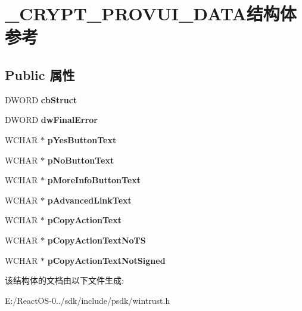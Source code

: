 \hypertarget{struct___c_r_y_p_t___p_r_o_v_u_i___d_a_t_a}{}\section{\+\_\+\+C\+R\+Y\+P\+T\+\_\+\+P\+R\+O\+V\+U\+I\+\_\+\+D\+A\+T\+A结构体 参考}
\label{struct___c_r_y_p_t___p_r_o_v_u_i___d_a_t_a}
\subsection*{Public 属性}
\begin{DoxyCompactItemize}
\item 
\mbox{\label{struct___c_r_y_p_t___p_r_o_v_u_i___d_a_t_a_a03b1e843fa9896f0546f51f0ba84831b}} 
D\+W\+O\+RD {\bfseries cb\+Struct}
\item 
\mbox{\label{struct___c_r_y_p_t___p_r_o_v_u_i___d_a_t_a_a644fe3b35c2614422038c10a9bec33a8}} 
D\+W\+O\+RD {\bfseries dw\+Final\+Error}
\item 
\mbox{\label{struct___c_r_y_p_t___p_r_o_v_u_i___d_a_t_a_a70a18e3d48f4a634eff4d34fe0e9eb4b}} 
W\+C\+H\+AR $\ast$ {\bfseries p\+Yes\+Button\+Text}
\item 
\mbox{\label{struct___c_r_y_p_t___p_r_o_v_u_i___d_a_t_a_af7da895311e3ab35634574e1e6c2c8bf}} 
W\+C\+H\+AR $\ast$ {\bfseries p\+No\+Button\+Text}
\item 
\mbox{\label{struct___c_r_y_p_t___p_r_o_v_u_i___d_a_t_a_a64e1ce5f5e75f93606e1503917260439}} 
W\+C\+H\+AR $\ast$ {\bfseries p\+More\+Info\+Button\+Text}
\item 
\mbox{\label{struct___c_r_y_p_t___p_r_o_v_u_i___d_a_t_a_a59e72eaf7dba1a1a6dc9fb9dcf68d0e2}} 
W\+C\+H\+AR $\ast$ {\bfseries p\+Advanced\+Link\+Text}
\item 
\mbox{\label{struct___c_r_y_p_t___p_r_o_v_u_i___d_a_t_a_abc1484bb2f384343a92dd7a915e56996}} 
W\+C\+H\+AR $\ast$ {\bfseries p\+Copy\+Action\+Text}
\item 
\mbox{\label{struct___c_r_y_p_t___p_r_o_v_u_i___d_a_t_a_ae34afeaf8dd650e5c397a3af5249754b}} 
W\+C\+H\+AR $\ast$ {\bfseries p\+Copy\+Action\+Text\+No\+TS}
\item 
\mbox{\label{struct___c_r_y_p_t___p_r_o_v_u_i___d_a_t_a_a51b38ae03b631129cad9d03f90cf2969}} 
W\+C\+H\+AR $\ast$ {\bfseries p\+Copy\+Action\+Text\+Not\+Signed}
\end{DoxyCompactItemize}


该结构体的文档由以下文件生成\+:\begin{DoxyCompactItemize}
\item 
E\+:/\+React\+O\+S-\/0../sdk/include/psdk/wintrust.\+h\end{DoxyCompactItemize}
